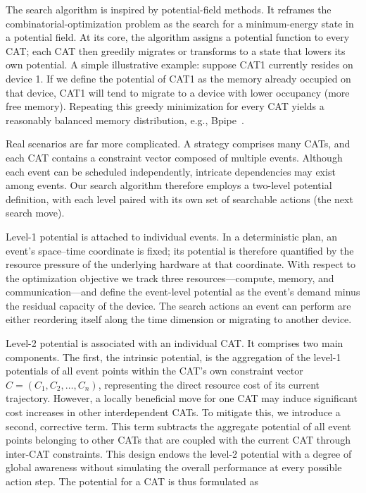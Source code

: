 \documentclass[letterpaper,twocolumn,10pt]{article}
\begin{document}
The search algorithm is inspired by potential-field methods. It reframes the combinatorial-optimization problem as the search for a minimum-energy state in a potential field. At its core, the algorithm assigns a potential function to every CAT; each CAT then greedily migrates or transforms to a state that lowers its own potential. A simple illustrative example: suppose CAT1 currently resides on device 1. If we define the potential of CAT1 as the memory already occupied on that device, CAT1 will tend to migrate to a device with lower occupancy (more free memory). Repeating this greedy minimization for every CAT yields a reasonably balanced memory distribution, e.g., Bpipe~\cite{kim2023bpipe}.

Real scenarios are far more complicated. A strategy comprises many CATs, and each CAT contains a constraint vector composed of multiple events. Although each event can be scheduled independently, intricate dependencies may exist among events. Our search algorithm therefore employs a two-level potential definition, with each level paired with its own set of searchable actions (the next search move).

Level-1 potential is attached to individual events. In a deterministic plan, an event’s space–time coordinate is fixed; its potential is therefore quantified by the resource pressure of the underlying hardware at that coordinate. With respect to the optimization objective we track three resources—compute, memory, and communication—and define the event-level potential as the event’s demand minus the residual capacity of the device. The search actions an event can perform are either reordering itself along the time dimension or migrating to another device.

Level-2 potential is associated with an individual CAT. It comprises two main components. The first, the intrinsic potential, is the aggregation of the level-1 potentials of all event points within the CAT’s own constraint vector $C=(C_1,C_2,\ldots ,C_n)$, representing the direct resource cost of its current trajectory. However, a locally beneficial move for one CAT may induce significant cost increases in other interdependent CATs. To mitigate this, we introduce a second, corrective term. This term subtracts the aggregate potential of all event points belonging to other CATs that are coupled with the current CAT through inter-CAT constraints. This design endows the level-2 potential with a degree of global awareness without simulating the overall performance at every possible action step. The potential for a CAT is thus formulated as
\end{document}
